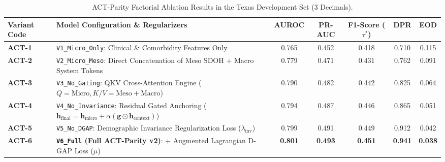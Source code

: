 \documentclass[10pt,journal]{IEEEtran}
\begin{document}
\begin{table}[!t]
\caption{ACT-Parity Factorial Ablation Results in the Texas Development Set (3 Decimals).}
\label{tab:s_act_ablation}
\centering
\footnotesize
\begin{tabular}{llccccc}
\toprule
\textbf{Variant Code} & \textbf{Model Configuration \& Regularizers} & \textbf{AUROC} & \textbf{PR-AUC} & \textbf{F1-Score ($\tau^*$)} & \textbf{DPR} & \textbf{EOD} \\
\midrule
\textbf{ACT-1} & \texttt{V1\_Micro\_Only}: Clinical \& Comorbidity Features Only & 0.765 & 0.452 & 0.418 & 0.710 & 0.115 \\
\textbf{ACT-2} & \texttt{V2\_Micro\_Meso}: Direct Concatenation of Meso SDOH + Macro System Tokens & 0.779 & 0.471 & 0.431 & 0.762 & 0.091 \\
\textbf{ACT-3} & \texttt{V3\_No\_Gating}: QKV Cross-Attention Engine ($Q=\text{Micro}, K/V=\text{Meso}+\text{Macro}$) & 0.790 & 0.482 & 0.442 & 0.825 & 0.064 \\
\textbf{ACT-4} & \texttt{V4\_No\_Invariance}: Residual Gated Anchoring ($\mathbf{h}_{\text{final}} = \mathbf{h}_{\text{micro}} + \alpha(\mathbf{g} \odot \mathbf{h}_{\text{context}})$) & 0.794 & 0.487 & 0.446 & 0.865 & 0.051 \\
\textbf{ACT-5} & \texttt{V5\_No\_DGAP}: Demographic Invariance Regularization Loss ($\lambda_{\text{inv}}$) & 0.799 & 0.491 & 0.449 & 0.912 & 0.042 \\
\textbf{ACT-6} & \textbf{\texttt{V6\_Full} (Full ACT-Parity v2)}: + Augmented Lagrangian D-GAP Loss ($\mu$) & \textbf{0.801} & \textbf{0.493} & \textbf{0.451} & \textbf{0.941} & \textbf{0.038} \\
\bottomrule
\end{tabular}
\end{table}
\end{document}
